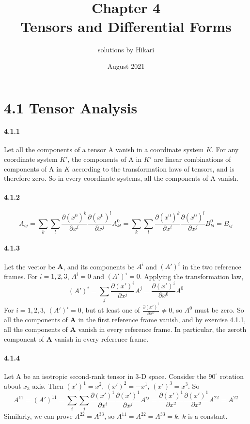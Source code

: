 \documentclass[a4paper]{article}
\title{Chapter 4\\Tensors and Differential Forms}
\author{solutions by Hikari}
\date{August 2021}
\begin{document}
\newcommand{\T}{\mathrm}
\newcommand{\V}{\mathbf}
\newcommand{\pdv}[2]{\frac{\partial#1}{\partial#2}}
\newcommand{\del}{\boldsymbol{\nabla}}
\newcommand{\VE}{\mathbf{\hat{e}}}
\newcommand{\EE}{\pmb{\varepsilon}}


\maketitle

\section*{4.1 Tensor Analysis}

\paragraph{4.1.1}
Let all the components of a tensor $\T{A}$ vanish in a coordinate system $K$. For any coordinate system $K'$, the components of $\T{A}$ in $K'$ are linear combinations of components of $\T{A}$ in $K$ according to the transformation laws of tensors, and is therefore zero. So in every coordinate systems, all the components of $\T{A}$ vanish.

\paragraph{4.1.2}
\[
A_{ij}=\sum_k\sum_l\pdv{(x^0)^k}{x^i}\pdv{(x^0)^l}{x^j}A^0_{kl}=\sum_k\sum_l\pdv{(x^0)^k}{x^i}\pdv{(x^0)^l}{x^j}B^0_{kl}=B_{ij}
\]

\paragraph{4.1.3}
Let the vector be $\V{A}$, and its components be $A^i$ and $(A')^i$ in the two reference frames. For $i=1,2,3$, $A^i=0$ and $(A')^i=0$. Applying the transformation law,
\[
(A')^i=\sum_j\pdv{(x')^i}{x^j}A^j=\pdv{(x')^i}{x^0}A^0
\]
For $i=1,2,3$, $(A')^i=0$, but at least one of $\pdv{(x')^i}{x^0}\neq0$, so $A^0$ must be zero. So all the components of $\V{A}$ in the first reference frame vanish, and by exercise 4.1.1, all the components of $\V{A}$ vanish in every reference frame. In particular, the zeroth component of $\V{A}$ vanish in every reference frame.

\paragraph{4.1.4}
Let $\T{A}$ be an isotropic second-rank tensor in 3-D space. Consider the $90^\circ$ rotation about $x_3$ axis. Then $(x')^1=x^2$, $(x')^2=-x^1$, $(x')^3=x^3$. So 
\[
A^{11}=(A')^{11}=\sum_i\sum_j\pdv{(x')^1}{x^i}\pdv{(x')^1}{x^j}A^{ij}=\pdv{(x')^1}{x^2}\pdv{(x')^1}{x^2}A^{22}=A^{22}
\]
Similarly, we can prove $A^{22}=A^{33}$, so $A^{11}=A^{22}=A^{33}=k$, $k$ is a constant.
\end{document}
